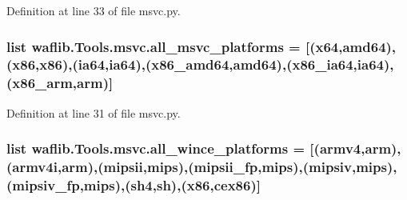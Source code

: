 Definition at line 33 of file msvc.\+py.

\subsubsection[{\texorpdfstring{all\+\_\+msvc\+\_\+platforms}{all_msvc_platforms}}]{\setlength{\rightskip}{0pt plus 5cm}list waflib.\+Tools.\+msvc.\+all\+\_\+msvc\+\_\+platforms = \mbox{[}(\textquotesingle{}x64\textquotesingle{},\textquotesingle{}amd64\textquotesingle{}),(\textquotesingle{}x86\textquotesingle{},\textquotesingle{}x86\textquotesingle{}),(\textquotesingle{}ia64\textquotesingle{},\textquotesingle{}ia64\textquotesingle{}),(\textquotesingle{}x86\+\_\+amd64\textquotesingle{},\textquotesingle{}amd64\textquotesingle{}),(\textquotesingle{}x86\+\_\+ia64\textquotesingle{},\textquotesingle{}ia64\textquotesingle{}),(\textquotesingle{}x86\+\_\+arm\textquotesingle{},\textquotesingle{}arm\textquotesingle{})\mbox{]}}\hypertarget{namespacewaflib_1_1_tools_1_1msvc_a89d948f635b53cc5f70812e75d91c465}{}\label{namespacewaflib_1_1_tools_1_1msvc_a89d948f635b53cc5f70812e75d91c465}


Definition at line 31 of file msvc.\+py.

\subsubsection[{\texorpdfstring{all\+\_\+wince\+\_\+platforms}{all_wince_platforms}}]{\setlength{\rightskip}{0pt plus 5cm}list waflib.\+Tools.\+msvc.\+all\+\_\+wince\+\_\+platforms = \mbox{[}(\textquotesingle{}armv4\textquotesingle{},\textquotesingle{}arm\textquotesingle{}),(\textquotesingle{}armv4i\textquotesingle{},\textquotesingle{}arm\textquotesingle{}),(\textquotesingle{}mipsii\textquotesingle{},\textquotesingle{}mips\textquotesingle{}),(\textquotesingle{}mipsii\+\_\+fp\textquotesingle{},\textquotesingle{}mips\textquotesingle{}),(\textquotesingle{}mipsiv\textquotesingle{},\textquotesingle{}mips\textquotesingle{}),(\textquotesingle{}mipsiv\+\_\+fp\textquotesingle{},\textquotesingle{}mips\textquotesingle{}),(\textquotesingle{}sh4\textquotesingle{},\textquotesingle{}sh\textquotesingle{}),(\textquotesingle{}x86\textquotesingle{},\textquotesingle{}cex86\textquotesingle{})\mbox{]}}\hypertarget{namespacewaflib_1_1_tools_1_1msvc_adbd268e79bee1dfb9e8410f4747ffbf7}{}\label{namespacewaflib_1_1_tools_1_1msvc_adbd268e79bee1dfb9e8410f4747ffbf7}


